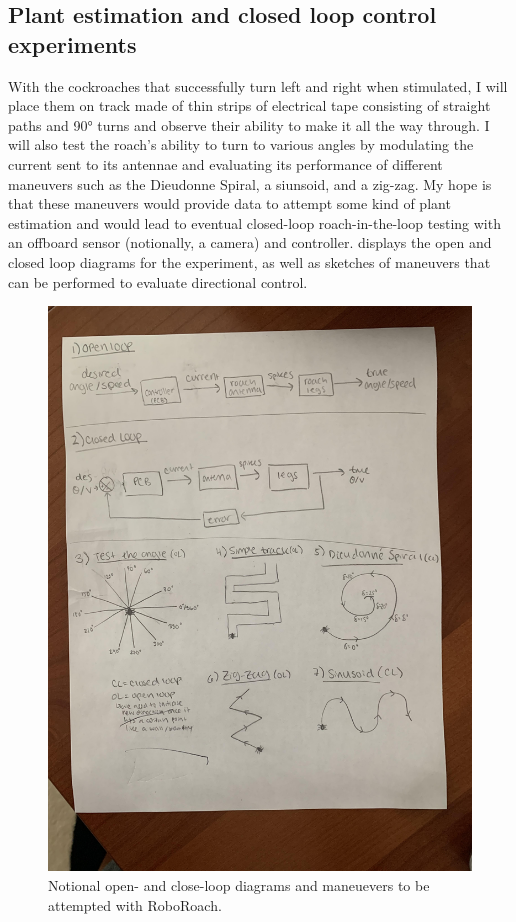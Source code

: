 \subsection{Plant estimation and closed loop control experiments}
With the cockroaches that successfully turn left and right when stimulated, I will place them on track made of thin strips of electrical tape consisting of straight paths and \ang{90} turns and observe their ability to make it all the way through. I will also test the roach's ability to turn to various angles by modulating the current sent to its antennae and evaluating its performance of different maneuvers such as the Dieudonne Spiral, a siunsoid, and a zig-zag. My hope is that these maneuvers would provide data to attempt some kind of plant estimation and would lead to eventual closed-loop roach-in-the-loop testing with an offboard sensor (notionally, a camera) and controller.  displays the open and closed loop diagrams for the experiment, as well as sketches of maneuvers that can be performed to evaluate directional control.
\begin{figure}[ht!]
\begin{center}
\includegraphics[scale=0.1]{Figures/OpenClosedLoops.jpg}
\end{center}
\caption{Notional open- and close-loop diagrams and maneuevers to be attempted with RoboRoach.}
\label{fig:rough}
\end{figure}

